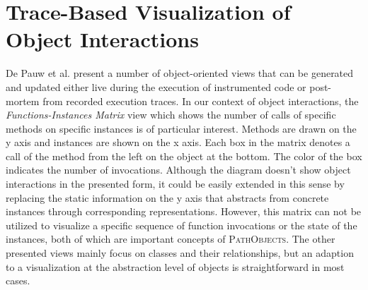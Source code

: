 \section[Trace-Based Visualization of Object Interactions]{Trace-Based Visualization of Object Interactions%
}

De Pauw et al. present a number of object-oriented views \cite{de_pauw_visualizing_1993, tokoro_modeling_1994} that can be generated and updated either live during the execution of instrumented code or post-mortem from recorded execution traces.
In our context of object interactions, the \emph{Functions-Instances Matrix} view  which shows the number of calls of specific methods on specific instances is of particular interest.
Methods are drawn on the y axis and instances are shown on the x axis.
Each box in the matrix denotes a call of the method from the left on the object at the bottom.
The color of the box indicates the number of invocations.
Although the diagram doesn't show object interactions in the presented form, it could be easily extended in this sense by replacing the static information on the y axis that abstracts from concrete instances through corresponding representations.
However, this matrix can not be utilized to visualize a specific sequence of function invocations or the state of the instances, both of which are important concepts of \textsc{PathObjects}.
The other presented views mainly focus on classes and their relationships, but an adaption to a visualization at the abstraction level of objects is straightforward in most cases.

